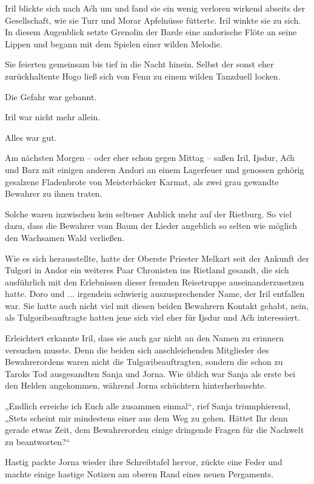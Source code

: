 Iril blickte sich nach Aćh um und fand sie ein wenig verloren wirkend abseits der Gesellschaft, wie sie Turr und Morar Apfelnüsse fütterte. Iril winkte sie zu sich. In diesem Augenblick setzte Grenolin der Barde eine andorische Flöte an seine Lippen und begann mit dem Spielen einer wilden Melodie.

Sie feierten gemeinsam bis tief in die Nacht hinein. Selbst der sonst eher zurückhaltente Hogo ließ sich von Fenn zu einem wilden Tanzduell locken.

Die Gefahr war gebannt.

Iril war nicht mehr allein.

Alles war gut.



\trennzeichen



Am nächsten Morgen – oder eher schon gegen Mittag – saßen Iril, Ijsdur, Aćh und Barz mit einigen anderen Andori an einem Lagerfeuer und genossen gehörig gesalzene Fladenbrote von Meisterbäcker Karmat, als zwei grau gewandte Bewahrer zu ihnen traten.

Solche waren inzwischen kein seltener Anblick mehr auf der Rietburg. So viel dazu, dass die Bewahrer vom Baum der Lieder angeblich so selten wie möglich den Wachsamen Wald verließen.

Wie es sich herausstellte, hatte der Oberste Priester Melkart seit der Ankunft der Tulgori in Andor ein weiteres Paar Chronisten ins Rietland gesandt, die sich ausführlich mit den Erlebnissen dieser fremden Reisetruppe auseinanderzusetzen hatte. Doro und ... irgendein schwierig auszusprechender Name, der Iril entfallen war. Sie hatte auch nicht viel mit diesen beiden Bewahrern Kontakt gehabt, nein, als Tulgoribeauftragte hatten jene sich viel eher für Ijsdur und Aćh interessiert.

Erleichtert erkannte Iril, dass sie auch gar nicht an den Namen zu erinnern versuchen musste. Denn die beiden sich anschleichenden Mitglieder des Bewahrerordens waren nicht die Tulgoribeauftragten, sondern die schon zu Taroks Tod ausgesandten Sanja und Jorna. Wie üblich war Sanja als erste bei den Helden angekommen, während Jorna schüchtern hinterherhuschte.

„Endlich erreiche ich Euch alle zusammen einmal“, rief Sanja triumphierend, „Stets scheint mir mindestens einer aus dem Weg zu gehen. Hättet Ihr denn gerade etwas Zeit, dem Bewahrerorden einige dringende Fragen für die Nachwelt zu beantworten?“

Hastig packte Jorna wieder ihre Schreibtafel hervor, zückte eine Feder und machte einige hastige Notizen am oberen Rand eines neuen Pergaments.

